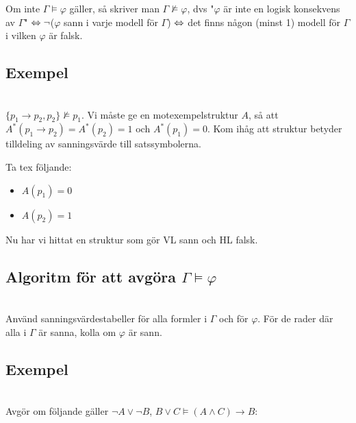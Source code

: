 \noindent Om inte $\Gamma\vDash\varphi$ gäller, så skriver man $\Gamma\nvDash\varphi$, dvs "$\varphi$ är inte en logisk konsekvens av $\Gamma$" $\Leftrightarrow\neg$($\varphi$ sann i varje modell för $\Gamma$) $\Leftrightarrow$ det finns någon (minst 1) modell för $\Gamma$ i vilken $\varphi$ är falsk.
\par\bigskip

\subsection{Exempel}\hfill\\
$\{p_1\rightarrow p_2, p_2\}\nvDash p_1$. Vi måste ge en motexempelstruktur $A$, så att $A^*(p_1\rightarrow p_2)=A^*(p_2)=1$ och $A^*(p_1)=0$. Kom ihåg att struktur betyder tilldeling av sanningsvärde till satssymbolerna.
\par\bigskip
\noindent Ta tex följande:
\begin{itemize}
  \item $A(p_1)=0$
  \item $A(p_2)=1$
\end{itemize}
\par\bigskip
\noindent Nu har vi hittat en struktur som gör VL sann och HL falsk.
\par\bigskip

\subsection{Algoritm för att avgöra $\Gamma\vDash\varphi$}\hfill\\

\noindent Använd sanningsvärdestabeller för alla formler i $\Gamma$ och för $\varphi$. För de rader där alla i $\Gamma$ är sanna, kolla om $\varphi$ är sann.
\par\bigskip
\subsection{Exempel}\hfill\\

\noindent Avgör om följande gäller $\neg A\vee \neg B$, $B\vee C\vDash(A\wedge C)\rightarrow B$:
\par\bigskip

